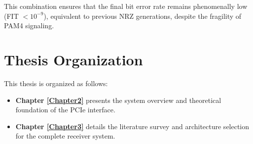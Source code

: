 This combination ensures that the final bit error rate remains phenomenally low (FIT $< 10^{-9}$), equivalent to previous NRZ generations, despite the fragility of PAM4 signaling.

\section{Thesis Organization}
This thesis is organized as follows:
\begin{itemize}
    \item \textbf{Chapter \ref{Chapter2}} presents the system overview and theoretical foundation of the PCIe interface.
    \item \textbf{Chapter \ref{Chapter3}} details the literature survey and architecture selection for the complete receiver system.
\end{itemize}
